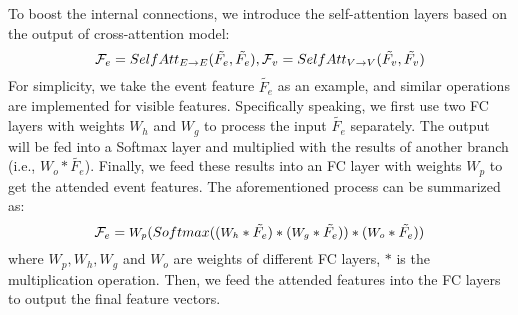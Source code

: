 \documentclass[journal]{IEEEtran}
\begin{document}
To boost the internal connections, we introduce the self-attention layers \cite{wang2018nonlocal} based on the output of cross-attention model: 
\begin{equation}
\label{SelfAtt1}
\small 
\mathcal{F}_e = SelfAtt_{E \rightarrow E} (\tilde{F_e}, \tilde{F_e}),    \mathcal{F}_v = SelfAtt_{V \rightarrow V} (\tilde{F_v}, \tilde{F_v})  
\end{equation}
For simplicity, we take the event feature $\tilde{F_e}$ as an example, and similar operations are implemented for visible features. Specifically speaking, we first use two FC layers with weights $W_h$ and $W_g$ to process the input $\tilde{F_e}$ separately. The output will be fed into a Softmax layer and multiplied with the results of another branch (i.e., $W_o * \tilde{F_e}$). Finally, we feed these results into an FC layer with weights $W_p$ to get the attended event features. The aforementioned process can be summarized as: 
\begin{equation}
\label{SelfAtt2}
\small 
\mathcal{F}_e = \textbf{$W_p$}(Softmax(   (\textbf{$W_h$} * \tilde{F_e}) * (\textbf{$W_g$} * \tilde{F_e})) * (\textbf{$W_o$} * \tilde{F_e}))
\end{equation}
where $W_p, W_h, W_g$ and $W_o$ are weights of different FC layers, $*$ is the multiplication operation. Then, we feed the attended features into the FC layers to output the final feature vectors. 

 
\end{document}
